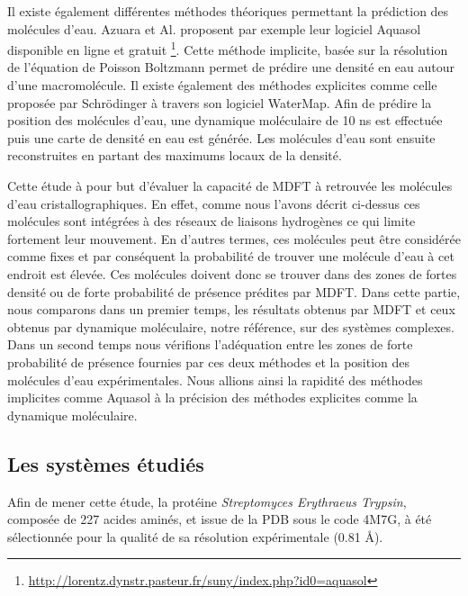 Il existe également différentes méthodes théoriques permettant la prédiction des molécules d'eau. Azuara et Al. proposent par exemple leur logiciel Aquasol \cite{azuara_pdb_hydro_2006} disponible en ligne et gratuit \footnote{\url{http://lorentz.dynstr.pasteur.fr/suny/index.php?id0=aquasol}}. Cette méthode implicite, basée sur la résolution de l'équation de Poisson Boltzmann permet de prédire une densité en eau autour d'une macromolécule. Il existe également des méthodes explicites comme celle proposée par Schrödinger à travers son logiciel WaterMap\cite{abel_role_2008}. Afin de prédire la position des molécules d'eau, une dynamique moléculaire de 10 ns est effectuée puis une carte de densité en eau est générée. Les molécules d'eau sont ensuite reconstruites en partant des maximums locaux de la densité. 


Cette étude à pour but d'évaluer la capacité de MDFT à retrouvée les molécules d'eau cristallographiques. En effet, comme nous l'avons décrit ci-dessus ces molécules sont intégrées à des réseaux de liaisons hydrogènes ce qui limite fortement leur mouvement. En d'autres termes, ces molécules peut être considérée comme fixes et par conséquent la probabilité de trouver une molécule d'eau à cet endroit est élevée. Ces molécules doivent donc se trouver dans des zones de fortes densité ou de forte probabilité de présence prédites par MDFT. Dans cette partie, nous comparons dans un premier temps, les résultats obtenus par MDFT et ceux obtenus par dynamique moléculaire, notre référence, sur des systèmes complexes. Dans un second temps nous vérifions l'adéquation entre les zones de forte probabilité de présence fournies par ces deux méthodes et la position des molécules d'eau expérimentales. Nous allions ainsi la rapidité des méthodes implicites comme Aquasol à la précision des méthodes explicites comme la dynamique moléculaire. 






\subsection{Les systèmes étudiés}
Afin de mener cette étude, la protéine \textit{Streptomyces Erythraeus Trypsin}, composée de 227 acides aminés, et issue de la PDB sous le code 4M7G, à été sélectionnée pour la qualité de sa résolution expérimentale (0.81 \AA).


